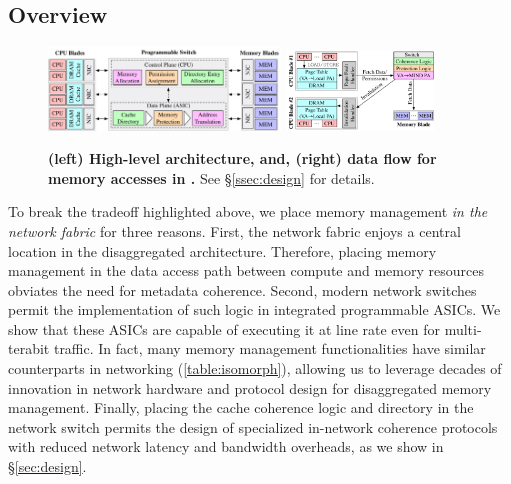 \subsection{\mind Overview}
\label{ssec:mindoverview}

\begin{figure}[!t]
\centering
\includegraphics[width=0.55\textwidth]{fig/mind/design}\hspace{3em}
\includegraphics[width=0.35\textwidth]{fig/mind/data_flow}%
\vspace{-0.5em}
\caption[High-level \mind architecture and data flow for memory accesses in \mind]{\textbf{(left) High-level \mind architecture, and, (right) data flow for memory accesses in \mind.} See \S\ref{ssec:design} for details.}
\label{fig:system_diagram}
\end{figure}

To break the tradeoff highlighted above, we place memory management \textit{in the network fabric} for three reasons.
First, the network fabric enjoys a central location in the disaggregated architecture. Therefore, placing memory management in the data access path between compute and memory resources obviates the need for metadata coherence. 
Second, modern network switches~\cite{progswitch1, progswitch2, progswitch3} permit the implementation of such logic in integrated programmable ASICs. We show that these ASICs are capable of executing it at line rate even for multi-terabit traffic. In fact, many memory management functionalities have similar counterparts in networking (\autoref{table:isomorph}), allowing us to leverage decades of innovation in network hardware and protocol design for disaggregated memory management.
Finally, placing the cache coherence logic and directory in the network switch permits the design of specialized in-network coherence protocols with reduced network latency and bandwidth overheads, as we show in \S\ref{sec:design}. 

